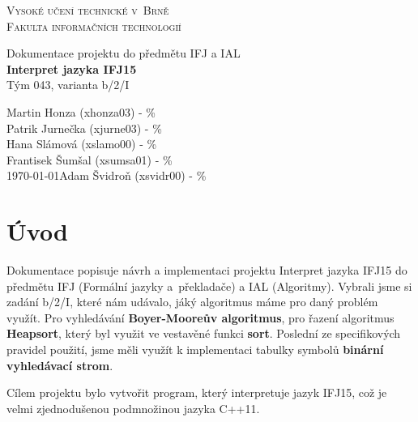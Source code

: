 \documentclass[a4paper, 11pt, titlepage]{article}
\begin{document}

\begin{titlepage} %
\begin{center}
\textsc{\Huge{Vysoké učení technické v~Brně}\\[3mm]\huge{Fakulta informačních technologií}}\\


\begin{figure}[h]
	\centering
\end{figure}

\huge{Dokumentace projektu do předmětu IFJ a IAL}\\
\Huge{\textbf{Interpret jazyka IFJ15}}\\
\LARGE{Tým 043, varianta b/2/I}
\end{center}

{\noindent\Large \hfill Martin Honza (xhonza03) - \%\\}
{\indent\Large \hfill Patrik Jurnečka (xjurne03) - \%\\}
{\indent\Large \hfill Hana Slámová (xslamo00) - \%\\}
{\indent\Large \hfill Frantisek Šumšal (xsumsa01) - \%\\}
{\indent\Large\today \hfill Adam Švidroň (xsvidr00) - \%}

\end{titlepage}

\tableofcontents

\newpage

\section{Úvod} %
Dokumentace popisuje návrh a implementaci projektu Interpret jazyka IFJ15 do předmětu IFJ (Formální jazyky a~překladače) a IAL (Algoritmy). Vybrali jsme si zadání b/2/I, které nám udávalo, jáký algoritmus máme pro daný problém využít. Pro vyhledávání \textbf{Boyer-Mooreův algoritmus}, pro řazení algoritmus \textbf{Heapsort}, který byl využit ve vestavěné funkci \textbf{sort}. Poslední ze specifikových pravidel použití, jsme měli využít k implementaci tabulky symbolů \textbf{binární vyhledávací strom}. 

Cílem projektu bylo vytvořit program, který interpretuje jazyk IFJ15, což je velmi zjednodušenou podmnožinou jazyka C++11. 
\end{document}
